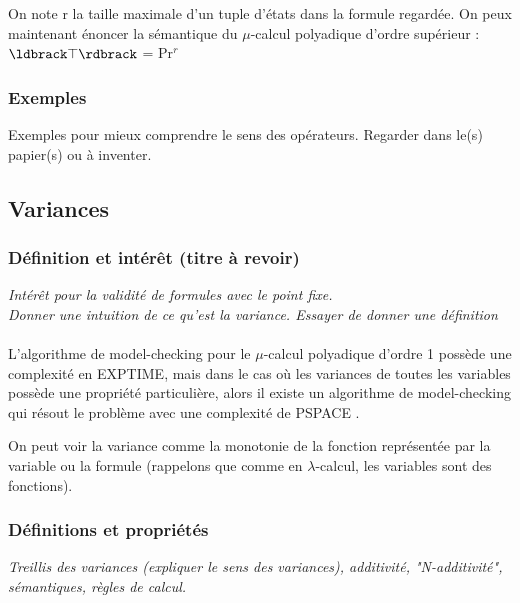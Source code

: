 \documentclass[11pt,a4paper]{article}
\begin{document}
On note r la taille maximale d'un tuple d'états dans la formule regardée. On peux maintenant énoncer la sémantique du $\mu$-calcul polyadique d'ordre supérieur :
\\
$\ldbrack \top \rdbrack$ = Pr$^r$
\\



\subsubsection{Exemples}

Exemples pour mieux comprendre le sens des opérateurs. Regarder dans le(s) papier(s) ou à inventer.

\subsection{Variances}

\subsubsection{Définition et intérêt (titre à revoir)}

\textit{Intérêt pour la validité de formules avec le point fixe. 
\\
Donner une intuition de ce qu'est la variance. Essayer de donner une définition}
\\\\
\color{red}
L'algorithme de model-checking pour le $\mu$-calcul polyadique d'ordre 1 possède une complexité en EXPTIME, mais dans le cas où les variances de toutes les variables possède une propriété particulière, alors il existe un algorithme de model-checking qui résout le problème avec une complexité de PSPACE \cite{lange2014model}.    

On peut voir la variance comme la monotonie de la fonction représentée par la variable ou la formule (rappelons que comme en $\lambda$-calcul, les variables sont des fonctions). \color{black}  

\subsubsection{Définitions et propriétés}

\textit{Treillis des variances (expliquer le sens des variances), additivité, "N-additivité", sémantiques, règles de calcul.}
\\\\
\end{document}
